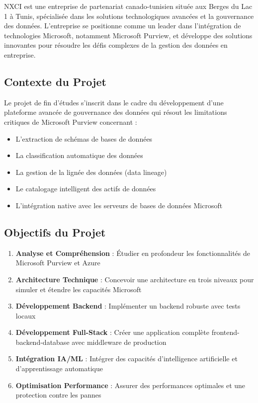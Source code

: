 \documentclass[12pt,a4paper]{article}
\begin{document}
NXCI est une entreprise de partenariat canado-tunisien située aux Berges du Lac 1 à Tunis, spécialisée dans les solutions technologiques avancées et la gouvernance des données. L'entreprise se positionne comme un leader dans l'intégration de technologies Microsoft, notamment Microsoft Purview, et développe des solutions innovantes pour résoudre les défis complexes de la gestion des données en entreprise.

\subsection{Contexte du Projet}

Le projet de fin d'études s'inscrit dans le cadre du développement d'une plateforme avancée de gouvernance des données qui résout les limitations critiques de Microsoft Purview concernant :
\begin{itemize}
    \item L'extraction de schémas de bases de données
    \item La classification automatique des données
    \item La gestion de la lignée des données (data lineage)
    \item Le catalogage intelligent des actifs de données
    \item L'intégration native avec les serveurs de bases de données Microsoft
\end{itemize}

\subsection{Objectifs du Projet}

\begin{enumerate}
    \item \textbf{Analyse et Compréhension} : Étudier en profondeur les fonctionnalités de Microsoft Purview et Azure
    \item \textbf{Architecture Technique} : Concevoir une architecture en trois niveaux pour simuler et étendre les capacités Microsoft
    \item \textbf{Développement Backend} : Implémenter un backend robuste avec tests locaux
    \item \textbf{Développement Full-Stack} : Créer une application complète frontend-backend-database avec middleware de production
    \item \textbf{Intégration IA/ML} : Intégrer des capacités d'intelligence artificielle et d'apprentissage automatique
    \item \textbf{Optimisation Performance} : Assurer des performances optimales et une protection contre les pannes
\end{enumerate}
\end{document}
